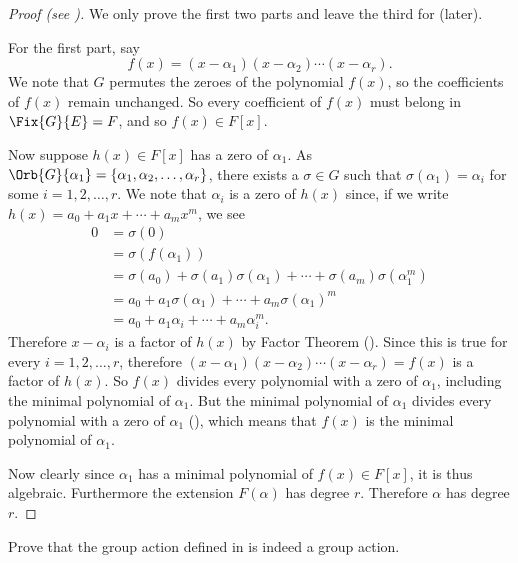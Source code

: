 \begin{proof}[Proof (see {\cite[Theorem 16.5.2]{artin_2011}})]
    We only prove the first two parts and leave the third for  (later).
    
    For the first part, say
    \[
        f(x) = (x-\alpha_1)(x-\alpha_2)\cdots(x-\alpha_r).
    \]
    We note that $G$ permutes the zeroes of the polynomial $f(x)$, so the coefficients of $f(x)$ remain unchanged. So every coefficient of $f(x)$ must belong in $\Fix{G}{E} = F$, and so $f(x) \in F[x]$.

    Now suppose $h(x) \in F[x]$ has a zero of $\alpha_1$. As $\Orb{G}{\alpha_1} = \{\alpha_1, \alpha_2, \dots, \alpha_r\}$, there exists a $\sigma \in G$ such that $\sigma(\alpha_1) = \alpha_i$ for some $i = 1, 2, \dots, r$. We note that $\alpha_i$ is a zero of $h(x)$ since, if we write $h(x) = a_0 + a_1x + \cdots + a_mx^m$, we see
    \begin{align*}
        0 &= \sigma(0)\\
        &= \sigma(f(\alpha_1))\\
        &= \sigma(a_0) + \sigma(a_1)\sigma(\alpha_1) + \cdots + \sigma(a_m)\sigma(\alpha_1^m)\\
        &= a_0 + a_1\sigma(\alpha_1) + \cdots + a_m\sigma(\alpha_1)^m\\
        &= a_0 + a_1\alpha_i + \cdots + a_m\alpha_i^m.
    \end{align*}
    Therefore $x - \alpha_i$ is a factor of $h(x)$ by Factor Theorem (). Since this is true for every $i = 1, 2, \dots, r$, therefore $(x-\alpha_1)(x-\alpha_2)\cdots(x-\alpha_r) = f(x)$ is a factor of $h(x)$. So $f(x)$ divides every polynomial with a zero of $\alpha_1$, including the minimal polynomial of $\alpha_1$. But the minimal polynomial of $\alpha_1$ divides every polynomial with a zero of $\alpha_1$ (), which means that $f(x)$ is the minimal polynomial of $\alpha_1$.

    Now clearly since $\alpha_1$ has a minimal polynomial of $f(x) \in F[x]$, it is thus algebraic. Furthermore the extension $F(\alpha)$ has degree $r$. Therefore $\alpha$ has degree $r$.
\end{proof}

\begin{exercise}
    Prove that the group action defined in  is indeed a group action.
\end{exercise}

